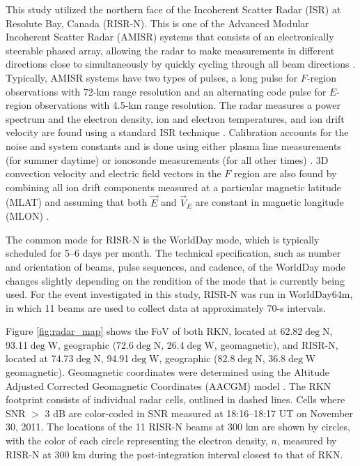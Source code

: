 This study utilized the northern face of the Incoherent Scatter Radar (ISR) at Resolute Bay, Canada (RISR-N).  This is one of the Advanced Modular Incoherent Scatter Radar (AMISR) systems that consists of an electronically steerable phased array, allowing the radar to make measurements in different directions close to simultaneously by quickly cycling through all beam directions \citep{Bahcivan2010}.  Typically, AMISR systems have two types of pulses, a long pulse for \(F\)-region observations with 72-km range resolution and an alternating code pulse for \(E\)-region observations with 4.5-km range resolution.  The radar measures a power spectrum and the electron density, ion and electron temperatures, and ion drift velocity are found using a standard ISR technique \citep{Evans1969,Risbeth1985,Nicolls2007}.  Calibration accounts for the noise and system constants \citep{Nicolls2007} and is done using either plasma line measurements (for summer daytime) or ionosonde measurements (for all other times) \citep{Bahcivan2010,Themens2014a}.  3D convection velocity and electric field vectors in the $F$ region are also found by combining all ion drift components measured at a particular magnetic latitude (MLAT) and assuming that both \(\vec{E}\) and \(\vec{V}_E\) are constant in magnetic longitude (MLON) \citep{Heinselman2008}.

The common mode for RISR-N is the WorldDay mode, which is typically scheduled for 5--6 days per month.  The technical specification, such as number and orientation of beams, pulse sequences, and cadence, of the WorldDay mode changes slightly depending on the rendition of the mode that is currently being used.  For the event investigated in this study, RISR-N was run in WorldDay64m, in which 11 beams are used to collect data at approximately 70-s intervals.

Figure \ref{fig:radar_map} shows the FoV of both RKN, located at 62.82\(\deg\)N, 93.11\(\deg\)W, geographic (72.6\(\deg\)N, 26.4\(\deg\)W, geomagnetic), and RISR-N, located at 74.73\(\deg\)N, 94.91\(\deg\)W, geographic (82.8\(\deg\)N, 36.8\(\deg\)W geomagnetic).  Geomagnetic coordinates were determined using the Altitude Adjusted Corrected Geomagnetic Coordinates (AACGM) model \citep{Shepard2014}.  The RKN footprint consists of individual radar cells, outlined in dashed lines.  Cells where SNR \(>\) 3 dB are color-coded in SNR measured at 18:16--18:17 UT on November 30, 2011. The locations of the 11 RISR-N beams at 300 km are shown by circles, with the color of each circle representing the electron density, \(n\), measured by RISR-N at 300 km during the post-integration interval closest to that of RKN.

